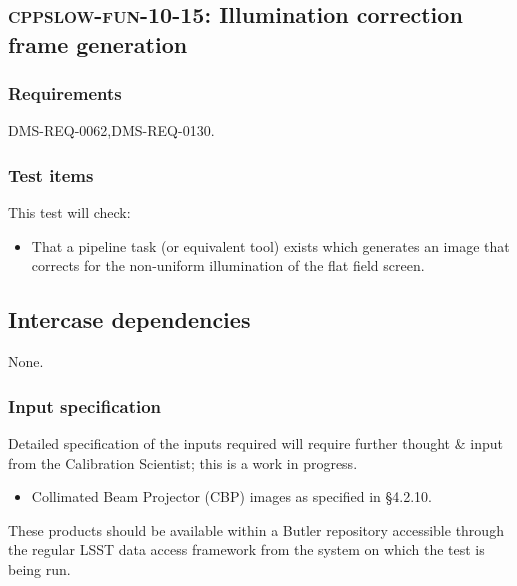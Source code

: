 \subsection{\textsc{cppslow-fun-10-15}: Illumination correction frame generation}
\label{cppslow-fun-10-15}

\subsubsection{Requirements}

DMS-REQ-0062,DMS-REQ-0130.

\subsubsection{Test items}

This test will check:

\begin{itemize}

  \item{That a pipeline task (or equivalent tool) exists which generates an
  image that corrects for the non-uniform illumination of the flat field
  screen.}

\end{itemize}

\subsection{Intercase dependencies}

None.

\subsubsection{Input specification}

\begin{note}
Detailed specification of the inputs required will require further thought \&
input from the Calibration Scientist; this is a work in progress.
\end{note}

\begin{itemize}

  \item{Collimated Beam Projector (CBP) images as specified in 
  \S4.2.10.}

\end{itemize}

These products should be available within a Butler repository accessible
through the regular LSST data access framework from the system on which the test
is being run.

